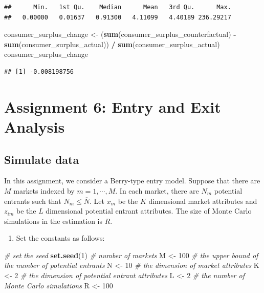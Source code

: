 \documentclass[]{book}
\newenvironment{Shaded}{\begin{snugshade}}{\end{snugshade}}
\newcommand{\KeywordTok}[1]{\textcolor[rgb]{0.13,0.29,0.53}{\textbf{#1}}}
\newcommand{\DecValTok}[1]{\textcolor[rgb]{0.00,0.00,0.81}{#1}}
\newcommand{\StringTok}[1]{\textcolor[rgb]{0.31,0.60,0.02}{#1}}
\newcommand{\CommentTok}[1]{\textcolor[rgb]{0.56,0.35,0.01}{\textit{#1}}}
\newcommand{\OperatorTok}[1]{\textcolor[rgb]{0.81,0.36,0.00}{\textbf{#1}}}
\newcommand{\NormalTok}[1]{#1}
\providecommand{\tightlist}{%
  \setlength{\itemsep}{0pt}\setlength{\parskip}{0pt}}
\begin{document}
\begin{verbatim}
##      Min.   1st Qu.    Median      Mean   3rd Qu.      Max. 
##   0.00000   0.01637   0.91300   4.11099   4.40189 236.29217
\end{verbatim}

\begin{Shaded}
\begin{Highlighting}[]
\NormalTok{consumer_surplus_change <-}\StringTok{ }
\StringTok{  }\NormalTok{(}\KeywordTok{sum}\NormalTok{(consumer_surplus_counterfactual) }\OperatorTok{-}\StringTok{ }
\StringTok{     }\KeywordTok{sum}\NormalTok{(consumer_surplus_actual)) }\OperatorTok{/}
\StringTok{  }\KeywordTok{sum}\NormalTok{(consumer_surplus_actual)}
\NormalTok{consumer_surplus_change}
\end{Highlighting}
\end{Shaded}

\begin{verbatim}
## [1] -0.008198756
\end{verbatim}

\chapter{Assignment 6: Entry and Exit Analysis}\label{assignment6}

\section{Simulate data}\label{simulate-data-5}

In this assignment, we consider a Berry-type entry model. Suppose that
there are \(M\) markets indexed by \(m = 1, \cdots, M\). In each market,
there are \(N_m\) potential entrants such that \(N_m \le \overline{N}\).
Let \(x_m\) be the \(K\) dimensional market attributes and \(z_{im}\) be
the \(L\) dimensional potential entrant attributes. The size of Monte
Carlo simulations in the estimation is \(R\).

\begin{enumerate}
\def\labelenumi{\arabic{enumi}.}
\tightlist
\item
  Set the constants as follows:
\end{enumerate}

\begin{Shaded}
\begin{Highlighting}[]
\CommentTok{# set the seed}
\KeywordTok{set.seed}\NormalTok{(}\DecValTok{1}\NormalTok{)}
\CommentTok{# number of markets}
\NormalTok{M <-}\StringTok{ }\DecValTok{100}
\CommentTok{# the upper bound of the number of potential entrants}
\NormalTok{N <-}\StringTok{ }\DecValTok{10}
\CommentTok{# the dimension of market attributes}
\NormalTok{K <-}\StringTok{ }\DecValTok{2}
\CommentTok{# the dimension of potential entrant attributes}
\NormalTok{L <-}\StringTok{ }\DecValTok{2}
\CommentTok{# the number of Monte Carlo simulations}
\NormalTok{R <-}\StringTok{ }\DecValTok{100}
\end{Highlighting}
\end{Shaded}
\end{document}
